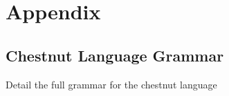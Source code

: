 \section{Appendix}

\subsection{Chestnut Language Grammar}

Detail the full grammar for the chestnut language

